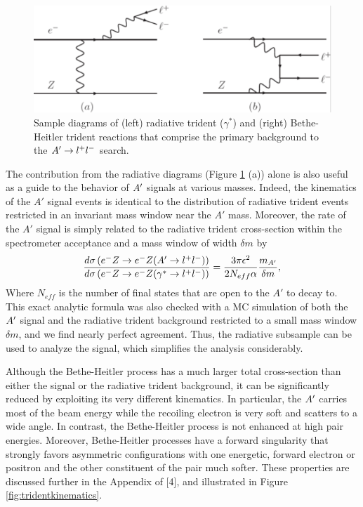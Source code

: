 \begin{figure}
\includegraphics[scale=1]{measurements/rad-bh-diagrams.pdf}
\caption{Sample diagrams of (left) radiative trident ($\gamma^*$) and (right) Bethe-Heitler trident reactions that comprise the primary background to the $A^\prime\rightarrow l^+l^-$  search.}
\label{fig:radbhdiagram}
\end{figure}

The contribution from the radiative diagrams (Figure \ref{fig:radbhdiagram} (a)) alone is also useful as a guide to the behavior of $A^\prime$ signals at various masses. Indeed, the kinematics of the $A'$ signal events is identical to the distribution of radiative trident events restricted in an invariant mass window near the $A'$ mass. Moreover, the rate of the $A'$ signal is simply related to the radiative trident cross-section within the spectrometer acceptance and a mass window of width $\delta m$ by 
\begin{equation}
\frac{d\sigma\left(e^- Z \rightarrow e^- Z(A^\prime\rightarrow l^+l^-)\right)}{d\sigma\left(e^- Z \rightarrow e^- Z(\gamma^*\rightarrow l^+l^-)\right)}=\frac{3\pi\epsilon^2}{2 N_{eff}\alpha}\frac{m_{A^\prime}}{\delta m}, 
\end{equation}
Where $N_{eff}$ is the number of final states that are open to the $A'$ to decay to.  This exact analytic formula was also checked with a MC simulation of both the $A^\prime$ signal and the radiative trident background restricted to a small mass window $\delta m$, and we find nearly perfect agreement. Thus, the radiative subsample can be used to analyze the signal, which simplifies the analysis considerably.

 Although the Bethe-Heitler process has a much larger total cross-section than either the signal or the radiative trident background, it can be significantly reduced by exploiting its very different kinematics. In particular, the $A^\prime$ carries most of the beam energy while the recoiling electron is very soft and scatters to a wide angle. In contrast, the Bethe-Heitler process is not enhanced at high pair energies. Moreover, Bethe-Heitler processes have a forward singularity that strongly favors asymmetric configurations with one energetic, forward electron or positron and the other constituent of the pair much softer.
These properties are discussed further in the Appendix of [4], and illustrated in Figure \ref{fig:tridentkinematics}.

